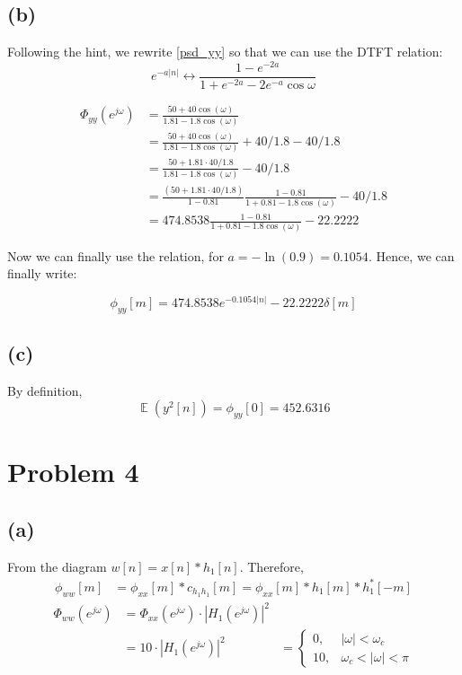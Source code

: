 \documentclass{article}
\DeclareMathOperator{\E}{\mathbb{E}}
\begin{document}
\subsection{(b)}

Following the hint, we rewrite \eqref{psd_yy} so that we can use the DTFT relation: 
\begin{equation}
e^{-a|n|} \longleftrightarrow \frac{1- e^{-2a}}{1+e^{-2a} -2e^{-a}\cos\omega}
\end{equation}

\begin{align} \nonumber
\Phi_{yy}(e^{j\omega}) &= \frac{50 + 40\cos(\omega)}{1.81 - 1.8\cos(\omega)} \\ \nonumber
&= \frac{50 + 40\cos(\omega)}{1.81 - 1.8\cos(\omega)}  + 40/1.8 - 40/1.8 \\ \nonumber
&= \frac{50 + 1.81\cdot 40/1.8}{1.81 - 1.8\cos(\omega)} - 40/1.8 \\ \nonumber
&= \frac{(50 + 1.81\cdot 40/1.8)}{1-0.81}\frac{1-0.81}{1 + 0.81 - 1.8\cos(\omega)} - 40/1.8 \\
&= 474.8538\frac{1-0.81}{1 + 0.81 - 1.8\cos(\omega)} - 22.2222
\end{align}

Now we can finally use the relation, for $a = -\ln(0.9) = 0.1054$. Hence, we can finally write:

\begin{equation}
\phi_{yy}[m] = 474.8538e^{-0.1054|n|} - 22.2222\delta[m]
\end{equation}

\subsection{(c)}
By definition,
\begin{equation}
\E(y^2[n]) = \phi_{yy}[0] = 452.6316
\end{equation}

\section{Problem 4}	
\subsection{(a)}
From the diagram $w[n] = x[n]\ast h_1[n]$. Therefore,
\begin{align}
\phi_{ww}[m] &= \phi_{xx}[m]\ast c_{h_1h_1}[m] = \phi_{xx}[m]\ast h_1[m]\ast h_1^*[-m]
\end{align}
\begin{align} \nonumber
\Phi_{ww}(e^{j\omega}) &= \Phi_{xx}(e^{j\omega})\cdot |H_1(e^{j\omega})|^2 \\
&= 10 \cdot |H_1(e^{j\omega})|^2
&= \begin{cases}
0, & |\omega| < \omega_c \\
10, & \omega_c < |\omega| < \pi
\end{cases}
\end{align}
\end{document}
